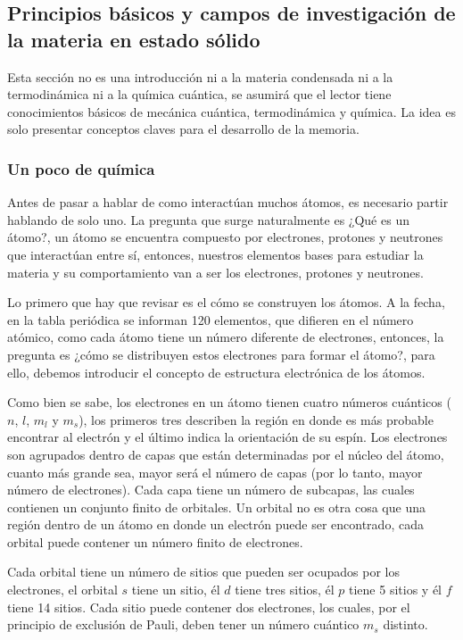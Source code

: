 %
%
%
%
%


\newpage
\subsection{Principios básicos y campos de investigación de la materia en estado sólido} 

Esta sección no es una introducción ni a la materia condensada ni a la termodinámica ni a la química cuántica, se asumirá que el lector tiene conocimientos básicos de mecánica cuántica, termodinámica y química. La idea es solo presentar conceptos claves para el desarrollo de la memoria.


\subsubsection{Un poco de química}

Antes de pasar a hablar de como interactúan muchos átomos, es necesario partir hablando de solo uno. La pregunta que surge naturalmente es ¿Qué es un átomo?, un átomo se encuentra compuesto por electrones, protones y neutrones que interactúan entre sí, entonces, nuestros elementos bases para estudiar la materia y su comportamiento van a ser los electrones, protones y neutrones.


Lo primero que hay que revisar es el cómo se construyen los átomos. A la fecha, en la tabla periódica se informan 120 elementos, que difieren en el número atómico, como cada átomo tiene un número diferente de electrones, entonces, la pregunta es ¿cómo se distribuyen estos electrones para formar el átomo?, para ello, debemos introducir el concepto de estructura electrónica de los átomos. 

Como bien se sabe, los electrones en un átomo tienen cuatro números cuánticos ($n$, $l$, $m_l$ y $m_s$), los primeros tres describen la región en donde es más probable encontrar al electrón y el último indica la orientación de su espín. Los electrones son agrupados dentro de capas que están determinadas por el núcleo del átomo, cuanto más grande sea, mayor será el número de capas (por lo tanto, mayor número de electrones). Cada capa tiene un número de subcapas, las cuales contienen un conjunto finito de orbitales. Un orbital no es otra cosa que una región dentro de un átomo en donde un electrón puede ser encontrado, cada orbital puede contener un número finito de electrones.

Cada orbital tiene un número de sitios que pueden ser ocupados por los electrones, el orbital $s$ tiene un sitio, él $d$ tiene tres sitios, él $p$ tiene 5 sitios y él $f$ tiene 14 sitios. Cada sitio puede contener dos electrones, los cuales, por el principio de exclusión de Pauli, deben tener un número cuántico $m_s$ distinto.

